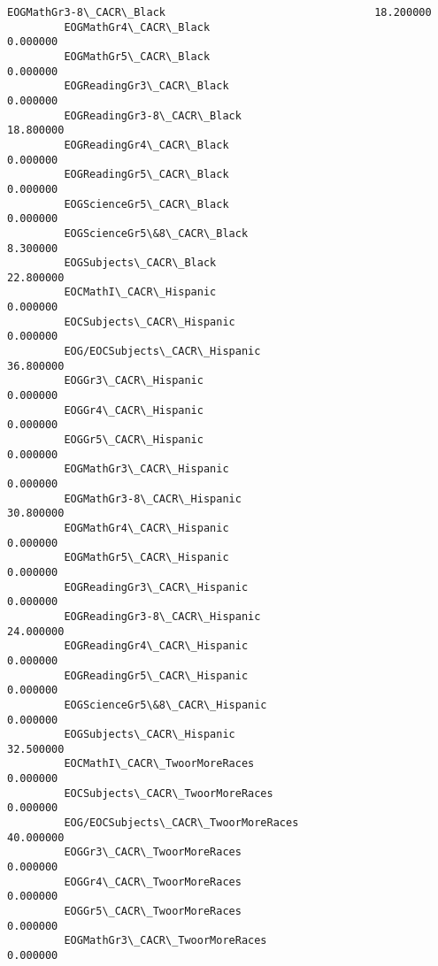\documentclass[11pt]{article}
\begin{document}
\begin{Verbatim}[commandchars=\\\{\}]
         EOGMathGr3-8\_CACR\_Black                                 18.200000   
         EOGMathGr4\_CACR\_Black                                    0.000000   
         EOGMathGr5\_CACR\_Black                                    0.000000   
         EOGReadingGr3\_CACR\_Black                                 0.000000   
         EOGReadingGr3-8\_CACR\_Black                              18.800000   
         EOGReadingGr4\_CACR\_Black                                 0.000000   
         EOGReadingGr5\_CACR\_Black                                 0.000000   
         EOGScienceGr5\_CACR\_Black                                 0.000000   
         EOGScienceGr5\&8\_CACR\_Black                               8.300000   
         EOGSubjects\_CACR\_Black                                  22.800000   
         EOCMathI\_CACR\_Hispanic                                   0.000000   
         EOCSubjects\_CACR\_Hispanic                                0.000000   
         EOG/EOCSubjects\_CACR\_Hispanic                           36.800000   
         EOGGr3\_CACR\_Hispanic                                     0.000000   
         EOGGr4\_CACR\_Hispanic                                     0.000000   
         EOGGr5\_CACR\_Hispanic                                     0.000000   
         EOGMathGr3\_CACR\_Hispanic                                 0.000000   
         EOGMathGr3-8\_CACR\_Hispanic                              30.800000   
         EOGMathGr4\_CACR\_Hispanic                                 0.000000   
         EOGMathGr5\_CACR\_Hispanic                                 0.000000   
         EOGReadingGr3\_CACR\_Hispanic                              0.000000   
         EOGReadingGr3-8\_CACR\_Hispanic                           24.000000   
         EOGReadingGr4\_CACR\_Hispanic                              0.000000   
         EOGReadingGr5\_CACR\_Hispanic                              0.000000   
         EOGScienceGr5\&8\_CACR\_Hispanic                            0.000000   
         EOGSubjects\_CACR\_Hispanic                               32.500000   
         EOCMathI\_CACR\_TwoorMoreRaces                             0.000000   
         EOCSubjects\_CACR\_TwoorMoreRaces                          0.000000   
         EOG/EOCSubjects\_CACR\_TwoorMoreRaces                     40.000000   
         EOGGr3\_CACR\_TwoorMoreRaces                               0.000000   
         EOGGr4\_CACR\_TwoorMoreRaces                               0.000000   
         EOGGr5\_CACR\_TwoorMoreRaces                               0.000000   
         EOGMathGr3\_CACR\_TwoorMoreRaces                           0.000000   

\end{Verbatim}
\end{document}

